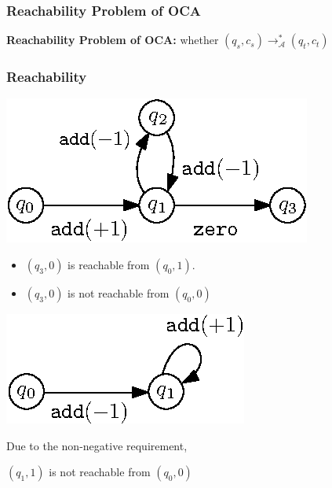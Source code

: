 \documentclass[11pt]{beamer}
\begin{document}
\begin{frame}\frametitle{Reachability Problem of OCA}

\textbf{Reachability Problem of OCA: } whether $(q_s, c_s)\rightarrow^*_{\mathcal{A}} (q_t, c_t)$

\begin{example}\frametitle{Reachability}
\begin{multicols}{2}
\begin{center}
\includegraphics[scale=1]{reachexample.eps}
\end{center}
\begin{itemize}
\item  $(q_3, 0)$ is reachable from $(q_0, 1)$.
\item  $(q_3, 0)$ is not reachable from $(q_0, 0)$ 
\end{itemize}

\begin{center}
\includegraphics[scale=1]{reachexample2.eps}

\end{center}
Due to the non-negative requirement,

$(q_1, 1)$ is not reachable from $(q_0, 0)$



\end{multicols}

\end{example}
\end{frame}
\end{document}
